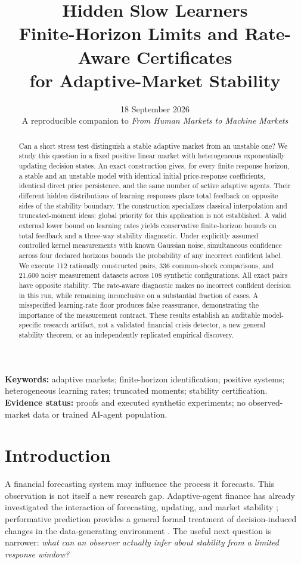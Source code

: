 \documentclass[11pt]{article}
\title{\textbf{Hidden Slow Learners}\\[5pt]\large Finite-Horizon Limits and Rate-Aware Certificates\\for Adaptive-Market Stability}
\author{}
\date{18 September 2026\\[3pt]\small A reproducible companion to \emph{From Human Markets to Machine Markets}}
\theoremstyle{remark}\newtheorem{remark}[theorem]{Remark}
\begin{document}
\maketitle
\begin{abstract}
Can a short stress test distinguish a stable adaptive market from an unstable one? We study this question in a fixed positive linear market with heterogeneous exponentially updating decision states. An exact construction gives, for every finite response horizon, a stable and an unstable model with identical initial price-response coefficients, identical direct price persistence, and the same number of active adaptive agents. Their different hidden distributions of learning responses place total feedback on opposite sides of the stability boundary. The construction specializes classical interpolation and truncated-moment ideas; global priority for this application is not established. A valid external lower bound on learning rates yields conservative finite-horizon bounds on total feedback and a three-way stability diagnostic. Under explicitly assumed controlled kernel measurements with known Gaussian noise, simultaneous confidence across four declared horizons bounds the probability of any incorrect confident label. We execute 112 rationally constructed pairs, 336 common-shock comparisons, and 21,600 noisy measurement datasets across 108 synthetic configurations. All exact pairs have opposite stability. The rate-aware diagnostic makes no incorrect confident decision in this run, while remaining inconclusive on a substantial fraction of cases. A misspecified learning-rate floor produces false reassurance, demonstrating the importance of the measurement contract. These results establish an auditable model-specific research artifact, not a validated financial crisis detector, a new general stability theorem, or an independently replicated empirical discovery.
\end{abstract}
\noindent\textbf{Keywords:} adaptive markets; finite-horizon identification; positive systems; heterogeneous learning rates; truncated moments; stability certification.\\
\textbf{Evidence status:} proofs and executed synthetic experiments; no observed-market data or trained AI-agent population.

\section{Introduction}
A financial forecasting system may influence the process it forecasts. This observation is not itself a new research gap. Adaptive-agent finance has already investigated the interaction of forecasting, updating, and market stability \citep{georges2021}; performative prediction provides a general formal treatment of decision-induced changes in the data-generating environment \citep{perdomo2020}. The useful next question is narrower: \emph{what can an observer actually infer about stability from a limited response window?}
\end{document}
